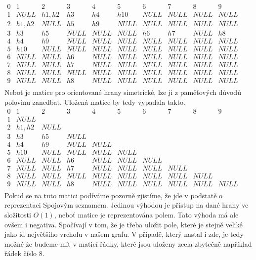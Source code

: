 $\begin{matrix}
 0 & 1 & 2 & 3 & 4 & 5 & 6 & 7 & 8 & 9 \\
 1 & NULL & h1,h2 & h3 & h4 & h10 & NULL & NULL & NULL & NULL \\
 2 & h1,h2 & NULL & h5 & h9 & NULL & NULL & NULL & NULL & NULL \\
 3 & h3 & h5  & NULL & NULL & NULL & h6 & h7 & NULL & h8 \\
 4 & h4 & h9 & NULL & NULL & NULL & NULL & NULL & NULL & NULL \\
 5 & h10 & NULL & NULL & NULL & NULL & NULL & NULL & NULL & NULL \\
 6 & NULL & NULL & h6 & NULL & NULL & NULL & NULL & NULL & NULL \\
 7 & NULL & NULL & h7 & NULL & NULL & NULL & NULL & NULL & NULL \\
 8 & NULL & NULL & NULL & NULL & NULL & NULL & NULL & NULL & NULL \\
 9 & NULL & NULL & h8 & NULL & NULL & NULL & NULL & NULL & NULL \\
\end{matrix}$\\

Neboť je matice pro orientované hrany simetrické, lze ji z paměťových důvodů polovinu zanedbat.
Uložená matice by tedy vypadala takto.\\

$\begin{matrix}
0 & 1 & 2 & 3 & 4 & 5 & 6 & 7 & 8 & 9 \\
1 & NULL  \\
2 & h1,h2 & NULL  \\
3 & h3 & h5  & NULL  \\
4 & h4 & h9 & NULL & NULL  \\
5 & h10 & NULL & NULL & NULL & NULL  \\
6 & NULL & NULL & h6 & NULL & NULL & NULL \\
7 & NULL & NULL & h7 & NULL & NULL & NULL & NULL \\
8 & NULL & NULL & NULL & NULL & NULL & NULL & NULL & NULL  \\
9 & NULL & NULL & h8 & NULL & NULL & NULL & NULL & NULL & NULL \\
\end{matrix}$\\

Pokud se na tuto matici podíváme pozorně zjistíme, že jde v podstatě o reprezentaci Spojovým seznamem. Jedinou výhodou je přístup na dané hrany ve složitosti $O(1)$, neboť matice je reprezentována polem. Tato výhoda má ale ovšem i negativa. Spočívají v tom, že je třeba uložit pole, které je stejně veliké jako id největšího vrcholu v našem grafu. V případě, který nastal i zde, je tedy možné že budeme mít v maticí řádky, které jsou uloženy zcela zbytečně například řádek číslo 8.\\

